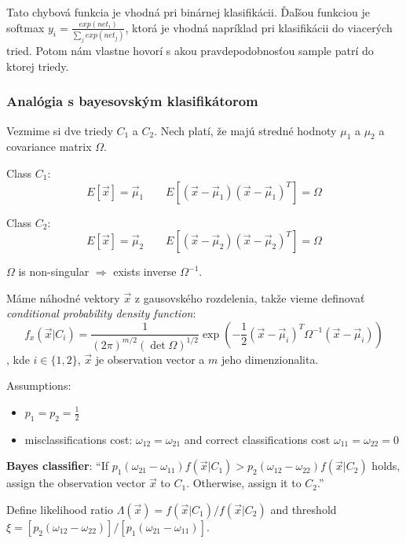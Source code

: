 \documentclass{article}
\numberwithin{equation}{section} %
\begin{document}
Tato chybová funkcia je vhodná pri binárnej klasifikácii. Ďaľšou funkciou je softmax $y_i = \frac{exp(net_i)}{\sum_j exp(net_j)}$, ktorá je vhodná napríklad pri klasifikácii do viacerých tried. Potom nám vlastne hovorí s akou pravdepodobnosťou sample patrí do ktorej triedy.

\subsubsection*{Analógia s bayesovským klasifikátorom}
Vezmime si dve triedy $C_1$ a $C_2$. Nech platí, že majú stredné hodnoty $\mu_1$ a $\mu_2$ a covariance matrix $\Omega$.

Class $C_1$:
$$E[\overrightarrow{x}] = \overrightarrow{\mu}_1 \qquad E[(\overrightarrow{x} - \overrightarrow{\mu}_1)(\overrightarrow{x} - \overrightarrow{\mu}_1)^T] = \Omega$$

Class $C_2$:
$$E[\overrightarrow{x}] = \overrightarrow{\mu}_2 \qquad E[(\overrightarrow{x} - \overrightarrow{\mu}_2)(\overrightarrow{x} - \overrightarrow{\mu}_2)^T] = \Omega$$

$\Omega$ is non-singular $\Rightarrow$ exists inverse $\Omega^{-1}$.

Máme náhodné vektory $\overrightarrow{x}$ z gausovského rozdelenia, takže vieme definovať \emph{conditional probability density function}:
$$f_x(\overrightarrow{x}|C_i) = \frac{1}{(2\pi)^{m/2}(\det \Omega)^{1/2}}\exp\left(-\frac{1}{2}(\overrightarrow{x} - \overrightarrow{\mu}_i)^T\Omega^{-1}(\overrightarrow{x}-\overrightarrow{\mu}_i)\right)$$
, kde $i \in \{ 1, 2 \}$, $\overrightarrow{x}$ je observation vector a $m$ jeho dimenzionalita.

Assumptions:
\begin{itemize}
\item $p_1 = p_2 = \frac{1}{2}$
\item misclassifications cost: $\omega_{12} = \omega_{21}$ and correct classifications cost $\omega_{11} = \omega_{22} = 0$
\end{itemize}

\textbf{Bayes classifier}: ``If $p_1(\omega_{21} - \omega_{11})f(\overrightarrow{x} | C_1) > p_2(\omega_{12} - \omega_{22})f(\overrightarrow{x}|C_2)$ holds, assign the observation vector $\overrightarrow{x}$ to $C_1$. Otherwise, assign it to $C_2$.''

Define likelihood ratio $\Lambda(\overrightarrow{x}) = f(\overrightarrow{x}|C_1) / f(\overrightarrow{x} | C_2)$ and threshold $\xi = [p_2(\omega_{12} - \omega_{22})]/[p_1(\omega_{21} - \omega_{11})]$.
\end{document}
